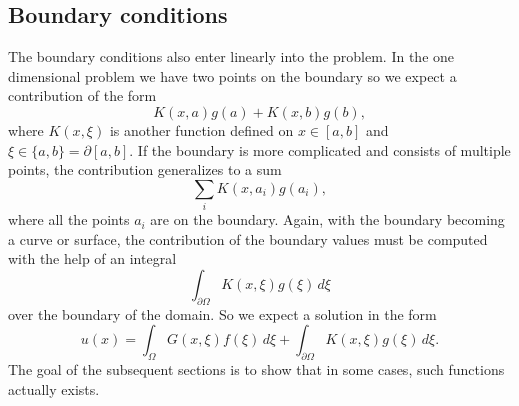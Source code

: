 \subsection{Boundary conditions}
The boundary conditions also enter linearly into the problem.
In the one dimensional problem we have two points on the boundary
so we expect a contribution of the form
\[
K(x,a) g(a) + K(x,b)g(b),
\]
where $K(x,\xi)$ is another function defined on $x\in [a,b]$ and
$\xi \in\{a,b\}=\partial[a,b]$.
If the boundary is more complicated and consists of multiple points,
the contribution generalizes to a sum
\[
\sum_{i}K(x,a_i)g(a_i),
\]
where all the points $a_i$ are on the boundary.
Again, with the boundary becoming a curve or surface, the
contribution of the boundary values must be computed with
the help of an integral
\[
\int_{\partial\Omega}K(x,\xi)g(\xi)\,d\xi
\]
over the boundary of the domain.
So we expect a solution in the form
\begin{equation}
u(x)=\int_{\Omega} G(x,\xi)f(\xi)\,d\xi + \int_{\partial\Omega} K(x,\xi)g(\xi)\,d\xi.
\label{greenformula}
\end{equation}
The goal of the subsequent sections is to show that in some cases,
such functions actually exists.

